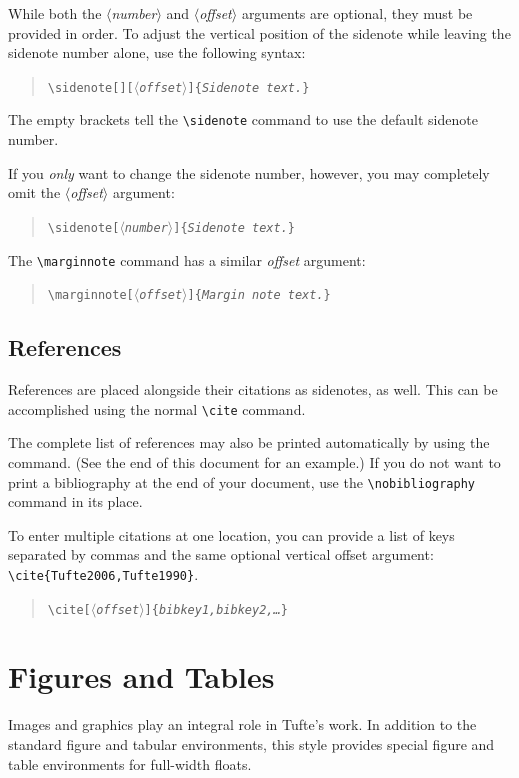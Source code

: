 \documentclass{tufte-handout}
\newcommand{\doccmd}[1]{\texttt{\textbackslash#1}}%
\newcommand{\docopt}[1]{\ensuremath{\langle}\textrm{\textit{#1}}\ensuremath{\rangle}}%
\newcommand{\docarg}[1]{\textrm{\textit{#1}}}%
\newenvironment{docspec}{\begin{quote}\noindent}{\end{quote}}%
\newcommand{\docenv}[1]{\textsf{#1}}%
\begin{document}
While both the \docopt{number} and \docopt{offset} arguments are optional, they
must be provided in order.  To adjust the vertical position of the sidenote
while leaving the sidenote number alone, use the following syntax:
\begin{docspec}
  \doccmd{sidenote[][\docopt{offset}]\{\docarg{Sidenote text.}\}}
\end{docspec}
The empty brackets tell the \Verb|\sidenote| command to use the default
sidenote number.

If you \emph{only} want to change the sidenote number, however, you may
completely omit the \docopt{offset} argument:
\begin{docspec}
  \doccmd{sidenote[\docopt{number}]\{\docarg{Sidenote text.}\}}
\end{docspec}

The \Verb|\marginnote| command has a similar \docarg{offset} argument:
\begin{docspec}
  \doccmd{marginnote[\docopt{offset}]\{\docarg{Margin note text.}\}}
\end{docspec}

\subsection{References}
References are placed alongside their citations as sidenotes,
as well.  This can be accomplished using the normal \Verb|\cite|
command.

The complete list of references may also be printed automatically by using
the \Verb|| command.  (See the end of this document for an
example.)  If you do not want to print a bibliography at the end of your
document, use the \Verb|\nobibliography| command in its place.  

To enter multiple citations at one location,\cite{Tufte2006,Tufte1990} you can
provide a list of keys separated by commas and the same optional vertical
offset argument: \Verb|\cite{Tufte2006,Tufte1990}|.  
\begin{docspec}
  \doccmd{cite[\docopt{offset}]\{\docarg{bibkey1,bibkey2,\ldots}\}}
\end{docspec}

\section{Figures and Tables}\label{sec:figures-and-tables}
Images and graphics play an integral role in Tufte's work.
In addition to the standard \docenv{figure} and \docenv{tabular} environments,
this style provides special figure and table environments for full-width
floats.
\end{document}
